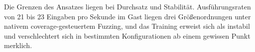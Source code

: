 Die Grenzen des Ansatzes liegen bei Durchsatz und Stabilität.
Ausführungsraten von \num{21} bis \num{23} Eingaben pro Sekunde im Gast liegen drei
Größenordnungen unter nativem coverage-gesteuertem Fuzzing, und das Training erweist sich als
instabil und verschlechtert sich in bestimmten Konfigurationen ab einem gewissen Punkt merklich.
